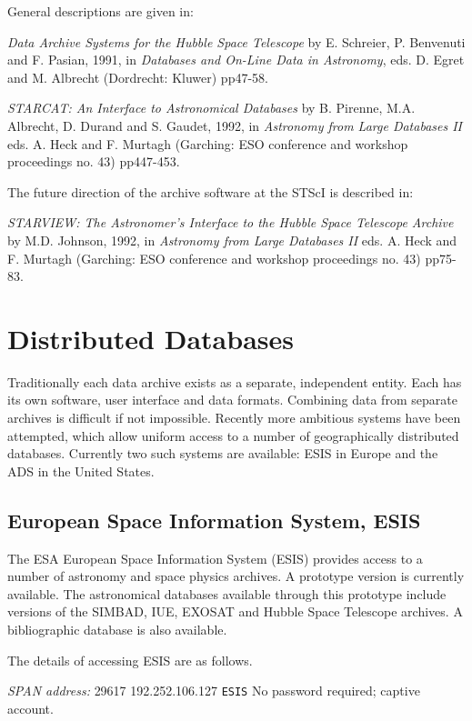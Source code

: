 General descriptions are given in:

{\it Data Archive Systems for the Hubble Space Telescope} by E. 
Schreier, P. Benvenuti and F. Pasian, 1991, in {\it Databases and 
On-Line Data in Astronomy}, eds. D. Egret and M. Albrecht (Dordrecht: 
Kluwer) pp47-58.

{\it STARCAT: An Interface to Astronomical Databases} by B. Pirenne,
M.A. Albrecht, D. Durand and S. Gaudet, 1992, in {\it Astronomy from 
Large Databases II} eds. A. Heck and F. Murtagh (Garching: ESO 
conference and workshop proceedings no. 43) pp447-453.

The future direction of the archive software at the STScI is described 
in:

{\it STARVIEW: The Astronomer's Interface to the Hubble Space Telescope
Archive} by M.D. Johnson, 1992, in {\it Astronomy from Large Databases 
II} eds. A. Heck and F. Murtagh (Garching: ESO conference and workshop 
proceedings no. 43) pp75-83.


\section{Distributed Databases}

Traditionally each data archive exists as a separate, independent
entity. Each has its own software, user interface and data formats.
Combining data from separate archives is difficult if not impossible.
Recently more ambitious systems have been attempted, which allow 
uniform access to a number of geographically distributed databases.
Currently two such systems are available: ESIS in Europe and the ADS
in the United States.

\subsection{European Space Information System, ESIS
}

The ESA European Space Information System (ESIS) provides access to a
number of astronomy and space physics archives. A prototype version
is currently available. The astronomical databases available through
this prototype include versions of the SIMBAD, IUE, EXOSAT and Hubble
Space Telescope archives. A bibliographic database is also available.

The details of accessing ESIS are as follows.

{\it SPAN address: } 29617
 192.252.106.127
 \verb-ESIS-
 No password required; captive account.

